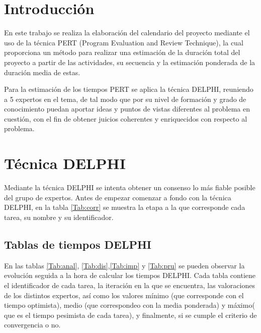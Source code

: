 \documentclass[11pt,a4paper,spanish,twoside]{report}
\begin{document}
\tableofcontents


\chapter*{Introducción}
En este trabajo se realiza la elaboración del calendario del proyecto
mediante el uso de la técnica PERT (Program Evaluation and Review Technique),
la cual proporciona un método para realizar una estimación de la duración
total del proyecto a partir de las actividades, su secuencia y la estimación
ponderada de la duración media de estas. 

Para la estimación de los tiempos PERT se aplica la técnica DELPHI, reuniendo
a 5 expertos en el tema, de tal modo que por su nivel de formación y grado de
conocimiento puedan aportar ideas y puntos de vistas diferentes al problema
en cuestión, con el fin de obtener juicios coherentes y enriquecidos con
respecto al problema. 
\chapter{Técnica DELPHI}
Mediante la técnica DELPHI se intenta obtener un consenso lo más fiable
posible del grupo de expertos. Antes de empezar comenzar a fondo con la
técnica DELPHI, en la tabla \ref{Tab:corr} se muestra la etapa a la que
corresponde cada tarea, su nombre y su identificador.
    
\section{Tablas de tiempos DELPHI}

En las tablas \ref{Tab:anal}, \ref{Tab:dis},\ref{Tab:imp} y \ref{Tab:pru}  se
pueden observar la evolución seguida a la hora de calcular los tiempos
DELPHI. Cada tabla contiene el identificador de cada tarea, la iteración en
la que se encuentra, las valoraciones de los distintos expertos, así como los
valores mínimo (que corresponde con el tiempo optimista), medio (que
correspondeo con la media ponderada) y máximo( que es el tiempo pesimista de
cada tarea), y finalmente, si se cumple el criterio de convergencia o no.
\end{document}
